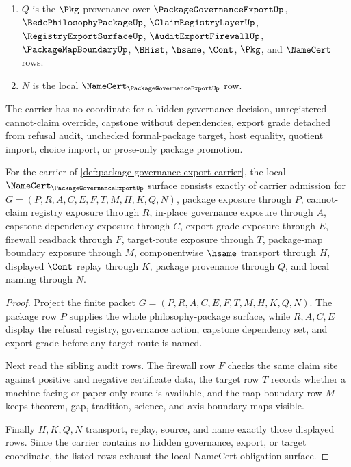 \begin{definition}
\begin{enumerate}
\item $Q$ is the $\Pkg$ provenance over $\PackageGovernanceExportUp$, $\BedcPhilosophyPackageUp$, $\ClaimRegistryLayerUp$, $\RegistryExportSurfaceUp$, $\AuditExportFirewallUp$, $\PackageMapBoundaryUp$, $\BHist$, $\hsame$, $\Cont$, $\Pkg$, and $\NameCert$ rows.
\item $N$ is the local $\NameCert_{\PackageGovernanceExportUp}$ row.
\end{enumerate}
The carrier has no coordinate for a hidden governance decision, unregistered cannot-claim override, capstone without dependencies, export grade detached from refusal audit, unchecked formal-package target, host equality, quotient import, choice import, or prose-only package promotion.
\end{definition}

\begin{theorem}
\label{thm:package-governance-export-namecert-obligations}
For the carrier of \autoref{def:package-governance-export-carrier}, the local $\NameCert_{\PackageGovernanceExportUp}$ surface consists exactly of carrier admission for $G=(P,R,A,C,E,F,T,M,H,K,Q,N)$, package exposure through $P$, cannot-claim registry exposure through $R$, in-place governance exposure through $A$, capstone dependency exposure through $C$, export-grade exposure through $E$, firewall readback through $F$, target-route exposure through $T$, package-map boundary exposure through $M$, componentwise $\hsame$ transport through $H$, displayed $\Cont$ replay through $K$, package provenance through $Q$, and local naming through $N$.
\end{theorem}
\begin{proof}
Project the finite packet $G=(P,R,A,C,E,F,T,M,H,K,Q,N)$. The package row $P$ supplies the whole philosophy-package surface, while $R,A,C,E$ display the refusal registry, governance action, capstone dependency set, and export grade before any target route is named.

Next read the sibling audit rows. The firewall row $F$ checks the same claim site against positive and negative certificate data, the target row $T$ records whether a machine-facing or paper-only route is available, and the map-boundary row $M$ keeps theorem, gap, tradition, science, and axis-boundary maps visible.

Finally $H,K,Q,N$ transport, replay, source, and name exactly those displayed rows. Since the carrier contains no hidden governance, export, or target coordinate, the listed rows exhaust the local NameCert obligation surface.
\end{proof}

